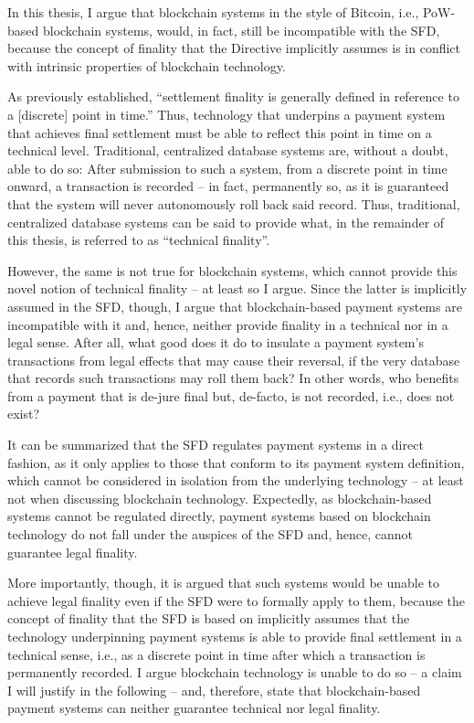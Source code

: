 In this thesis, I argue that blockchain systems in the style of Bitcoin, i.e., PoW-based blockchain systems, would, in fact, still be incompatible with the SFD, because the concept of finality that the Directive implicitly assumes is in conflict with intrinsic properties of blockchain technology.

As previously established, ``settlement finality is generally defined in reference to a [discrete] point in time.'' \autocite{liao2017}
Thus, technology that underpins a payment system that achieves final settlement must be able to reflect this point in time on a technical level.
Traditional, centralized database systems are, without a doubt, able to do so:
After submission to such a system, from a discrete point in time onward, a transaction is recorded -- in fact, permanently so, as it is guaranteed that the system will never autonomously roll back said record.
Thus, traditional, centralized database systems can be said to provide what, in the remainder of this thesis, is referred to as ``technical finality''.

However, the same is not true for blockchain systems, which cannot provide this novel notion of technical finality -- at least so I argue.
Since the latter is implicitly assumed in the SFD, though, I argue that blockchain-based payment systems are incompatible with it and, hence, neither provide finality in a technical nor in a legal sense. After all, what good does it do to insulate a payment system's transactions from legal effects that may cause their reversal, if the very database that records such transactions may roll them back?
In other words, who benefits from a payment that is de-jure final but, de-facto, is not recorded, i.e., does not exist?

It can be summarized that the SFD regulates payment systems in a direct fashion, as it only applies to those that conform to its payment system definition, which cannot be considered in isolation from the underlying technology -- at least not when discussing blockchain technology.
Expectedly, as blockchain-based systems cannot be regulated directly, payment systems based on blockchain technology do not fall under the auspices of the SFD and, hence, cannot guarantee legal finality.

More importantly, though, it is argued that such systems would be unable to achieve legal finality even if the SFD were to formally apply to them, because the concept of finality that the SFD is based on implicitly assumes that the technology underpinning payment systems is able to provide final settlement in a technical sense, i.e., as a discrete point in time after which a transaction is permanently recorded.
I argue blockchain technology is unable to do so -- a claim I will justify in the following -- and, therefore, state that blockchain-based payment systems can neither guarantee technical nor legal finality.
